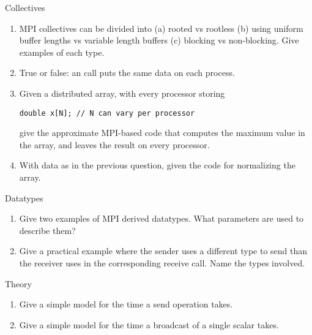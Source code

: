  {Collectives}

\begin{enumerate}

\item MPI collectives can be divided into (a) rooted vs rootless (b) using uniform
buffer lengths vs variable length buffers (c) blocking vs non-blocking. Give examples of
each type.  

\item True or false: an  call puts the same data on
  each process.

\item Given a distributed array, with every processor storing
\begin{lstlisting}
double x[N]; // N can vary per processor
\end{lstlisting}
give the approximate MPI-based code that computes the maximum value
in the array, and leaves the result on every processor.

\item With data as in the previous question, given the code for
normalizing the array.
\end{enumerate}

 {Datatypes}

\begin{enumerate}
\item Give two examples of MPI derived datatypes. What parameters are used
to describe them?

\item Give a practical example where the sender uses a different type to send
  than the receiver uses in the corresponding receive call. Name the types involved.

\end{enumerate}

 {Theory}

\begin{enumerate}

\item Give a simple model for the time a send operation takes.

\item Give a simple model for the time a broadcast of a single scalar takes.


\end{enumerate}

